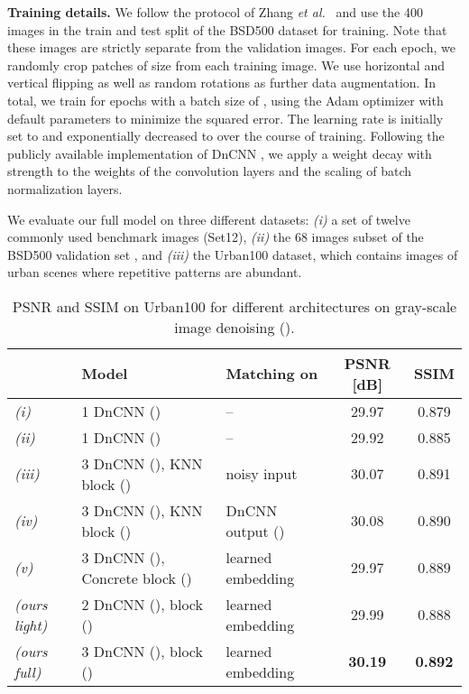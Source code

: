 \documentclass{article}
\makeatletter
\newcommand{\etal}{\emph{et al.}\@\xspace}
\newcommand{\myparagraph}[1]{\smallskip\noindent\textbf{#1}}
\makeatother
\begin{document}
\myparagraph{Training details.}
We follow the protocol of Zhang \etal~\cite{Zhang:2017:BGD} and use the 400 images in the train and test split of the BSD500 dataset for training. 
Note that these images are strictly separate from the validation images. 
For each epoch, we randomly crop  patches of size  from each training image. 
We use horizontal and vertical flipping as well as random rotations  as further
data augmentation. 
In total, we train for  epochs with a batch size of ,
using the Adam optimizer \cite{Kingma:2014:ADAM} with default parameters
 to minimize the squared error. 
The learning rate is initially set to  and exponentially decreased to
 over the course of training. 
Following the publicly available implementation of DnCNN \cite{Zhang:2017:BGD},
we apply a weight decay with strength  to the weights of the
convolution layers and the scaling of batch normalization layers.

We evaluate our full model on three different datasets:
\emph{(i)} a set of twelve commonly used benchmark images (Set12),
\emph{(ii)} the 68 images subset \cite{Roth:2009:FEF} of the
BSD500 validation set \cite{Martin:2001:BDB}, and
\emph{(iii)} the Urban100 \cite{Huang:2015:SelfEx} dataset, which contains images of urban scenes where repetitive patterns are abundant.

\begin{table*}[tb]
	\caption{PSNR and SSIM \cite{Wang:2003:MSS} on Urban100 for different architectures on gray-scale image denoising ().}
	\label{tab:ablation_urban_sigma25}
	\footnotesize
	\centering
	\smallskip
	\begin{tabularx}{\linewidth}{@{}l X l S[table-format=2.2] S[table-format=1.3]@{}}
		\toprule
		& Model							& Matching on 	&  {PSNR [dB]}	& {SSIM}	\\ 		\midrule
		\emph{(i)}& 1  DnCNN ()						& {--}						&  29.97		&  0.879 \\ 		\emph{(ii)}& 1  DnCNN ()						& {--}						&  29.92		&  0.885 \\ 						\emph{(iii)}& 3  DnCNN (), KNN block ()	& noisy input			&  30.07		& 0.891 \\
		\emph{(iv)}& 3  DnCNN (), KNN block ()	& DnCNN output ()	&  30.08		& 0.890 \\
		\emph{(v)}& 3  DnCNN (), Concrete block ()	& learned embedding	&  29.97 		&  0.889 \\
		\midrule
		\emph{(ours light)}& 2  DnCNN (),  block ()	& learned embedding & 29.99 		& 0.888 \\
		\emph{(ours full)}& 3  DnCNN (),  block ()	& learned embedding & \bfseries 30.19 		& \bfseries 0.892 \\
		\bottomrule
	\end{tabularx}
\end{table*}
\end{document}
